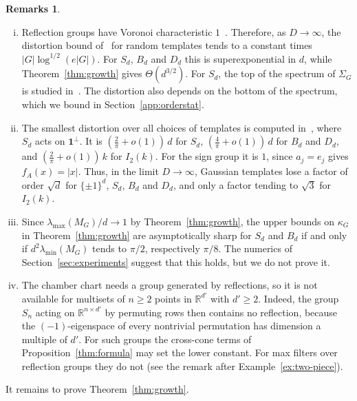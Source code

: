 \documentclass[11pt]{article}
\newcommand{\R}{\mathbb{R}}
\theoremstyle{definition}
\newtheorem{rems}[theor]{Remarks}
\begin{document}
\begin{rems}\leavevmode
	\label{rems:reflection}
	\begin{enumerate}[(i)]
		\item Reflection groups have Voronoi characteristic $1$~\cite[Lem.~41]{mixonqaddura}. Therefore, as $D\to\infty$, the distortion bound of~\cite[Thm.~32]{mixonqaddura} for random templates
		tends to a constant times $|G|\log^{1/2}(e|G|)$. For $S_d$, $B_d$ and $D_d$ this
		is superexponential in $d$, while Theorem~\ref{thm:growth} gives $\Theta(d^{3/2})$. For
		$S_d$, the top of the spectrum of $\Sigma_G$ is studied
		in~\cite[Sec.~5.4]{cahill2025group}. The distortion also depends on the bottom of the
		spectrum, which we bound in Section~\ref{app:orderstat}.
		
		\item The smallest distortion over all choices of templates is computed
		in~\cite[Thms.~6 and~7]{mixonpacker}, where $S_d$ acts on $\mathbf 1^{\perp}$. It is
		$(\tfrac2\pi+o(1))\,d$ for $S_d$, $(\tfrac4\pi+o(1))\,d$ for $B_d$ and $D_d$, and
		$(\tfrac2\pi+o(1))\,k$ for $I_2(k)$. For the sign group it is $1$, since $a_j=e_j$ gives
		$f_A(x)=|x|$. Thus, in the limit $D\to\infty$, Gaussian templates lose a factor of order $\sqrt d$ for
		$\{\pm1\}^d$, $S_d$, $B_d$ and $D_d$, and only a factor tending to $\sqrt3$ for $I_2(k)$.
		
		\item Since $\lambda_{\max}(M_G)/d\to1$ by Theorem~\ref{thm:growth}, the upper bounds on $\kappa_G$ in
		Theorem~\ref{thm:growth} are asymptotically sharp for $S_d$ and $B_d$ if and only if
		$d^2\lambda_{\min}(M_G)$ tends to $\pi/2$, respectively $\pi/8$. The numerics of
		Section~\ref{sec:experiments} suggest that this holds, but we do not prove it.
		
		\item The chamber chart needs a group generated by reflections, so it is not available for
		multisets of $n\ge2$ points in $\R^{d'}$ with $d'\ge2$. Indeed, the group $S_n$ acting on
		$\R^{n\times d'}$ by permuting rows then contains no reflection, because the
		$(-1)$-eigenspace of every nontrivial permutation has dimension a multiple of $d'$. For
		such groups the cross-cone terms of Proposition~\ref{thm:formula} may set the lower
		constant. For max filters over reflection groups they do not (see the remark after
		Example~\ref{ex:two-piece}).
	\end{enumerate}
\end{rems}
It remains to prove Theorem~\ref{thm:growth}.
\end{document}
